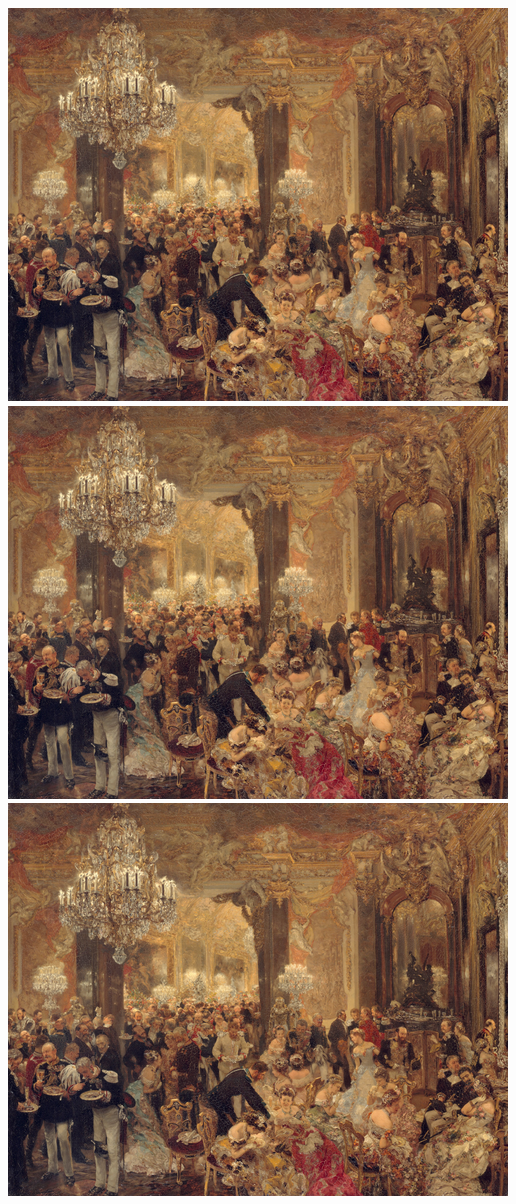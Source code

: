 \documentclass[
  letterpaper,
  DIV=11,
  numbers=noendperiod]{scrartcl}
\begin{document}
\includegraphics{paintingsSommer_files/figure-pdf/cell-5-output-2.png}\hspace{-26pt}
\includegraphics{paintingsSommer_files/figure-pdf/cell-5-output-3.png}
\includegraphics{paintingsSommer_files/figure-pdf/cell-5-output-4.png}
\end{document}
